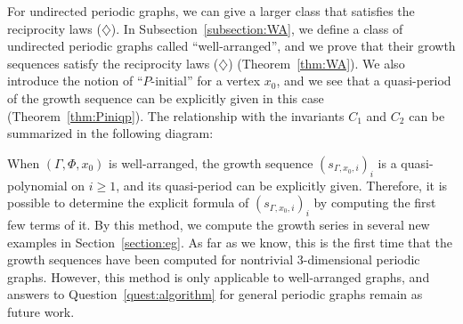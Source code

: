 \documentclass[ALCO,published]{cedram}
\theoremstyle{remark}
\begin{document}
For undirected periodic graphs, we can give a larger class that satisfies the reciprocity laws ($\diamondsuit$). 
In Subsection~\ref{subsection:WA}, we define a class of undirected periodic graphs called ``well-arranged'', and we prove that their growth sequences satisfy the reciprocity laws ($\diamondsuit$) (Theorem~\ref{thm:WA}). 
We also introduce the notion of ``$P$-initial'' for a vertex $x_0$, and 
we see that a quasi-period of the growth sequence can be explicitly given in this case (Theorem~\ref{thm:Piniqp}). The relationship with the invariants $C_1$ and $C_2$ can be summarized in the following diagram: 

\vspace{2mm}

\begin{center}\end{center}

When $(\Gamma, \Phi, x_0)$ is well-arranged, the growth sequence $(s_{\Gamma, x_0, i})_i$ is a quasi-polynomial on $i \ge 1$, and its quasi-period can be explicitly given. 
Therefore, it is possible to determine the explicit formula of $(s_{\Gamma, x_0, i})_i$ by computing the first few terms of it. 
By this method, we compute the growth series in several new examples in Section~\ref{section:eg}. 
As far as we know, this is the first time that the growth sequences have been computed for nontrivial $3$-dimensional periodic graphs. 
However, this method is only applicable to well-arranged graphs, and
answers to Question~\ref{quest:algorithm} for general periodic graphs remain as future work. 
\end{document}
